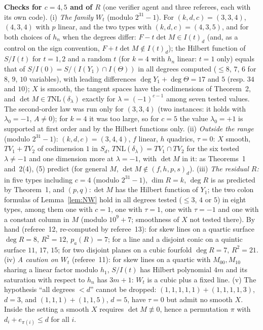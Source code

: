 \documentclass[11pt]{article}
\numberwithin{equation}{section}
\theoremstyle{remark}
\newcommand{\NL}{\mathrm{NL}}
\newcommand{\lz}{\lambda_0}
\newcommand{\run}[1]{\medskip\noindent\textbf{#1}}
\begin{document}
\run{Checks for $c=4,5$ and of $R$} (one verifier agent and three referees, each with its own code).
(i) \emph{The family $W_t$} (modulo $2^{31}-1$). For $(k,d,c)=(3,3,4)$, $(4,3,4)$ with $p$ linear, and the two
types with $(k,d,c)=(4,3,5)$, and for both choices of $h_n$ when the degrees differ: $F-t\det M\in I(t)_d$ (and,
as a control on the sign convention, $F+t\det M\notin I(t)_d$); the Hilbert function of $S/I(t)$ for $t=1,2$
and a random $t$ (for $k=4$ with $h_n$ linear: $t=1$ only) equals that of $S/I(0)=S/(I(Y_1)\cap I(\Theta))$ in
all degrees computed ($\le8$, $7$, $6$ for $8$, $9$, $10$ variables), with leading differences
$\deg Y_1+\deg\Theta=17$ and $5$ (resp. $34$ and $10$); $X$ is smooth, the tangent spaces have the codimensions
of Theorem~2, and $\det M\in T\NL(\delta_\lambda)$ exactly for $\lambda=(-1)^{c-1}$ among seven tested values. The
second-order law was run only for $(3,3,4)$ (two instances: it holds with $\lz=-1$, $A\ne0$); for $k=4$ it was
too large, so for $c=5$ the value $\lz=+1$ is supported at first order and by the Hilbert functions only.
(ii) \emph{Outside the range} (modulo $2^{31}-1$): $(k,d,c)=(3,4,4)$, $f$ linear, $h$ quadrics, $\tau=0$: $X$
smooth, $TV_1+TV_2$ of codimension $1$ in $S_d$, $T\NL(\delta_\lambda)=TV_1\cap TV_2$ for the six tested
$\lambda\neq-1$ and one dimension more at $\lambda=-1$, with $\det M$ in it: as Theorems~1 and~2(4), (5) predict
(for general $M$, $\det M\notin(f,h,p,s)_d$).
(iii) \emph{The residual $R$:} in five types including $c=4$ (modulo $2^{31}-1$), $\dim R=k$, $\deg R$ is as
predicted by Theorem~1, and $(p,q):\det M$ has the Hilbert function of $Y_1$; the two colon formulas of
Lemma~\ref{lem:NW} hold in all degrees tested ($\le3$, $4$ or $5$) in eight types, among them one with $c=1$,
one with $\tau=1$, one with $\tau=-1$ and one with a constant column in $M$ (modulo $10^9+7$; smoothness of $X$ not tested there). By hand
(referee~12, re-computed by referee~13): for skew lines on a quartic surface $\deg R=8$, $R^2=12$, $p_a(R)=7$;
for a line and a disjoint conic on a quintic surface $11$, $17$, $15$; for two disjoint planes on a cubic
fourfold $\deg R=7$, $R^2=21$. (iv) \emph{A caution on $W_t$} (referee~11): for skew lines on a quartic with
$M_{00},M_{10}$ sharing a linear factor modulo $h_1$, $S/I(t)$ has Hilbert polynomial $4m$ and its saturation
with respect to $h_n$ has $3m+1$: $W_t$ is a cubic plus a fixed line. (v) The hypothesis ``all degrees $<d$''
cannot be dropped: $(1,1,1,1,1)+(1,1,1,1,3)$, $d=3$, and $(1,1,1)+(1,1,5)$, $d=5$, have $\tau=0$ but admit no
smooth $X$. Inside the setting a smooth $X$ requires $\det M\not\equiv0$, hence a permutation $\pi$ with
$d_i+e_{\pi(i)}\le d$ for all $i$.
\end{document}
